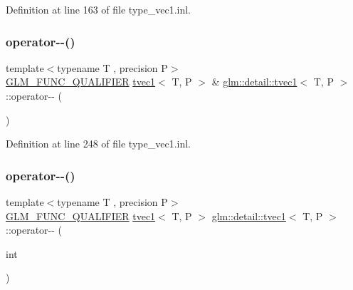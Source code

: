 Definition at line 163 of file type\+\_\+vec1.\+inl.

\mbox{\label{structglm_1_1detail_1_1tvec1_a777ac8b6fe013405c6015d518a2096a6}} 
\subsubsection{\texorpdfstring{operator-\/-\/()}{operator--()}\hspace{0.1cm}{\footnotesize\ttfamily [1/2]}}
{\footnotesize\ttfamily template$<$typename T , precision P$>$ \\
\hyperlink{setup_8hpp_a33fdea6f91c5f834105f7415e2a64407}{G\+L\+M\+\_\+\+F\+U\+N\+C\+\_\+\+Q\+U\+A\+L\+I\+F\+I\+ER} \hyperlink{structglm_1_1detail_1_1tvec1}{tvec1}$<$ T, P $>$ \& \hyperlink{structglm_1_1detail_1_1tvec1}{glm\+::detail\+::tvec1}$<$ T, P $>$\+::operator-\/-\/ (\begin{DoxyParamCaption}{ }\end{DoxyParamCaption})}



Definition at line 248 of file type\+\_\+vec1.\+inl.

\mbox{\label{structglm_1_1detail_1_1tvec1_a6fab4adec100e472d3b3d7da65ef2053}} 
\subsubsection{\texorpdfstring{operator-\/-\/()}{operator--()}\hspace{0.1cm}{\footnotesize\ttfamily [2/2]}}
{\footnotesize\ttfamily template$<$typename T , precision P$>$ \\
\hyperlink{setup_8hpp_a33fdea6f91c5f834105f7415e2a64407}{G\+L\+M\+\_\+\+F\+U\+N\+C\+\_\+\+Q\+U\+A\+L\+I\+F\+I\+ER} \hyperlink{structglm_1_1detail_1_1tvec1}{tvec1}$<$ T, P $>$ \hyperlink{structglm_1_1detail_1_1tvec1}{glm\+::detail\+::tvec1}$<$ T, P $>$\+::operator-\/-\/ (\begin{DoxyParamCaption}\item[{int}]{ }\end{DoxyParamCaption})}



